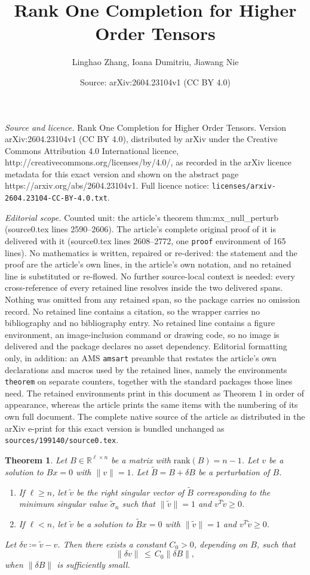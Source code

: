 \documentclass[10pt,a4paper]{amsart}
\title{Rank One Completion for Higher Order Tensors}
\author{Linghao Zhang, Ioana Dumitriu, Jiawang Nie}
\date{Source: arXiv:2604.23104v1 (CC BY 4.0)}
\newtheorem{theorem}{Theorem}
\newcommand{\be}{\begin{equation}}
\newcommand{\bnum}{\begin{enumerate}}
\newcommand{\dt}{\delta}
\newcommand{\ee}{\end{equation}}
\newcommand{\enum}{\end{enumerate}}
\def\rank{\mbox{rank}}
\newcommand{\re}{\mathbb{R}}
\newcommand{\tsig}{\tilde{\sigma}}
\newcommand{\tv}{\tilde{v}}
\begin{document}
\maketitle

\noindent\emph{Source and licence.} Rank One Completion for Higher Order Tensors. Version arXiv:2604.23104v1 (CC BY 4.0), distributed by arXiv under the Creative Commons Attribution 4.0 International licence, http://creativecommons.org/licenses/by/4.0/, as recorded in the arXiv licence metadata for this exact version and shown on the abstract page https://arxiv.org/abs/2604.23104v1. Full licence notice: \texttt{licenses/arxiv-2604.23104-CC-BY-4.0.txt}.\par\smallskip

\noindent\textit{Editorial scope.} Counted unit: the article's theorem thm:mx\_null\_perturb (source0.tex lines 2590--2606). The article's complete original proof of it is delivered with it (source0.tex lines 2608--2772, one \texttt{proof} environment of 165 lines). No mathematics is written, repaired or re-derived: the statement and the proof are the article's own lines, in the article's own notation, and no retained line is substituted or re-flowed.  No further source-local context is needed: every cross-reference of every retained line resolves inside the two delivered spans.  Nothing was omitted from any retained span, so the package carries no omission record.  No retained line contains a citation, so the wrapper carries no bibliography and no bibliography entry.  No retained line contains a figure environment, an image-inclusion command or drawing code, so no image is delivered and the package declares no asset dependency.  Editorial formatting only, in addition: an AMS \texttt{amsart} preamble that restates the article's own declarations and macros used by the retained lines, namely the environments \texttt{theorem} on separate counters, together with the standard packages those lines need.  The retained environments print in this document as Theorem 1 in order of appearance, whereas the article prints the same items with the numbering of its own full document.  The complete native source of the article as distributed in the arXiv e-print for this exact version is bundled unchanged as \texttt{sources/199140/source0.tex}.
\begin{theorem}\label{thm:mx_null_perturb}
Let $B \in \re^{\ell \times n}$ be a matrix with $\rank (B) = n-1$.
Let $v$ be a solution to $Bx = 0$ with $\|v\|=1$.
Let $\widetilde{B} = B + \dt B$ be a perturbation of $B$.

\bnum
\item[(i)] If $\ell \ge n$, let $\tv$ be the right singular vector of $\widetilde{B}$ corresponding to the minimum singular value $\tsig_n$ such that $\|\tv\|=1$ and $v^T\tv \ge 0$.

\item[(ii)] If $\ell<n$, let $\tv$ be a solution to $\widetilde{B}x = 0$ with $\|\tv\|=1$ and $v^T\tv \ge 0$.
\enum
Let $\dt v \coloneqq \tv - v$.
Then there exists a constant $C_0>0$, depending on $B$, such that
\be\label{dv<=C0dB}
\|\dt v\| \,\le\, C_0 \|\dt B\|,
\ee
when $\|\dt B\|$ is sufficiently small.
\end{theorem}
\end{document}

